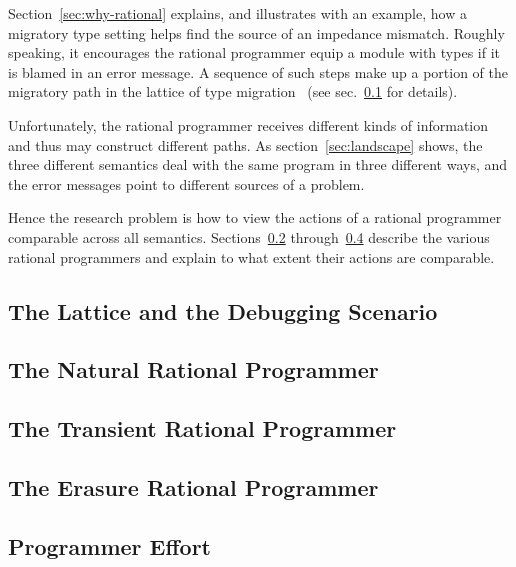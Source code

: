 
Section~\ref{sec:why-rational} explains, and illustrates with an example, how a
migratory type setting helps find the source of an impedance mismatch. Roughly
speaking, it encourages the rational programmer equip a module with types if it
is blamed in an error message. A sequence of such steps make up a portion of the
migratory path in the lattice of type migration~\cite{tfgnvf-popl-2016} (see
sec.~\ref{sub:stuff} for details). 

Unfortunately, the rational programmer receives different kinds of information
and thus may construct different paths. As section~\ref{sec:landscape} shows,
the three different semantics deal with the same program in three different
ways, and the error messages point to different sources of a problem.

Hence the research problem is how to view the actions of a rational programmer
comparable across all semantics. Sections~\ref{sub:natural}
through~\ref{sub:erasure} describe the various rational programmers and explain
to what extent their actions are comparable.

\def\rsub#1#2{\subsection{#2} \label{sub:#1} }

\rsub{stuff}     {The Lattice and the Debugging Scenario} 

\rsub{natural}   {The Natural Rational Programmer} 
\rsub{transient} {The Transient Rational Programmer} 
\rsub{erasure}   {The Erasure Rational Programmer} 
\rsub{effort}    {Programmer Effort} \label{subsec:effort}
